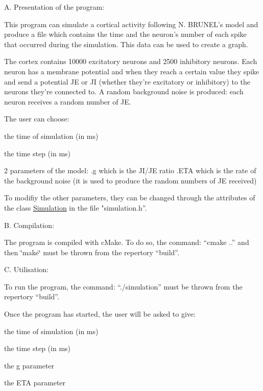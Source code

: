 A. Presentation of the program\-:

This program can simulate a cortical activity following N. B\-R\-U\-N\-E\-L’s model and produce a file which contains the time and the neuron’s number of each spike that occurred during the simulation. This data can be used to create a graph.

The cortex contains 10000 excitatory neurons and 2500 inhibitory neurons. Each neuron has a membrane potential and when they reach a certain value they spike and send a potential J\-E or J\-I (whether they’re excitatory or inhibitory) to the neurons they’re connected to. A random background noise is produced\-: each neuron receives a random number of J\-E.

The user can choose\-:
\begin{DoxyItemize}
\item the time of simulation (in ms)
\item the time step (in ms)
\item 2 parameters of the model\-: .g which is the J\-I/\-J\-E ratio .E\-T\-A which is the rate of the background noise (it is used to produce the random numbers of J\-E received)
\end{DoxyItemize}

To modifiy the other parameters, they can be changed through the attributes of the class \hyperlink{classSimulation}{Simulation} in the file "simulation.\-h”. \begin{DoxyVerb}B. Compilation:
\end{DoxyVerb}


The program is compiled with c\-Make. To do so, the command\-: “cmake ..” and then \char`\"{}make\char`\"{} must be thrown from the repertory “build”. \begin{DoxyVerb}C. Utilisation:
\end{DoxyVerb}



\begin{DoxyItemize}
\item To run the program, the command\-: “./simulation” must be thrown from the repertory “build”.
\end{DoxyItemize}

Once the program has started, the user will be asked to give\-:
\begin{DoxyItemize}
\item the time of simulation (in ms)
\item the time step (in ms)
\item the g parameter
\item the E\-T\-A parameter
\end{DoxyItemize}

